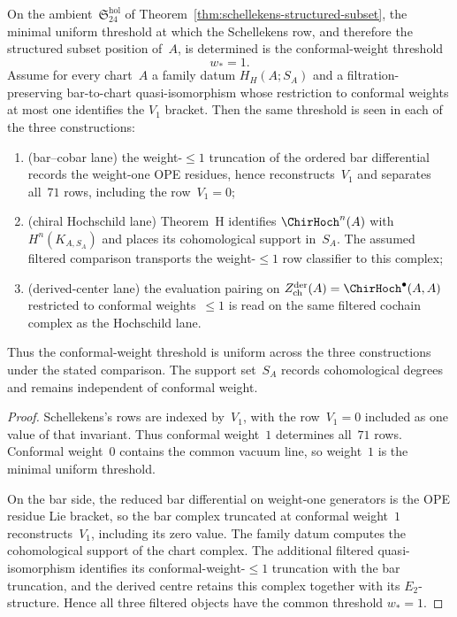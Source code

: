 \begin{proposition}
\label{prop:schellekens-weight-one-threshold}
\label{prop:schellekens-weight-two-threshold}
\ClaimStatusConditional
On the ambient~$\mathfrak{S}_{24}^{\mathrm{hol}}$ of
Theorem~\ref{thm:schellekens-structured-subset}, the minimal uniform
threshold at which the Schellekens row, and therefore the structured
subset position of~$A$, is determined is the conformal-weight threshold
\[
w_\ast = 1.
\]
Assume for every chart~$A$ a family datum $H_H(A;S_A)$ and a
filtration-preserving bar-to-chart quasi-isomorphism whose restriction
to conformal weights at most one identifies the $V_1$ bracket. Then
the same threshold is seen in each
of the three constructions:
\begin{enumerate}[label=\textup{(\roman*)},leftmargin=*]
\item \textup{(}bar--cobar lane\textup{)}
 the weight-$\le1$ truncation of the ordered bar differential records
 the weight-one OPE residues, hence reconstructs~$V_1$ and separates
 all~$71$ rows, including the row~$V_1=0$;
\item \textup{(}chiral Hochschild lane\textup{)}
 Theorem~H identifies
 $\ChirHoch^n(A)$ with $H^n(K_{A,S_A})$ and places its
 cohomological support in~$S_A$.  The assumed filtered comparison
 transports the weight-$\le1$ row classifier to this complex;
\item \textup{(}derived-center lane\textup{)}
 the evaluation pairing on
 $Z^{\mathrm{der}}_{\mathrm{ch}}(A)=\ChirHoch^\bullet(A,A)$ restricted
 to conformal weights~$\le1$ is read on the same filtered cochain
 complex as the Hochschild lane.
\end{enumerate}
Thus the conformal-weight threshold is uniform across the three
constructions under the stated comparison.  The support set~$S_A$
records cohomological degrees and remains independent of conformal
weight.
\end{proposition}

\begin{proof}
Schellekens's rows are indexed by~$V_1$, with the row~$V_1=0$ included
as one value of that invariant. Thus conformal weight~$1$ determines
all~$71$ rows. Conformal weight~$0$ contains the common vacuum line,
so weight~$1$ is the minimal uniform threshold.

On the bar side, the reduced bar differential on weight-one generators
is the OPE residue Lie bracket, so the bar complex truncated at
conformal weight~$1$ reconstructs~$V_1$, including its zero value. The
family datum computes the cohomological support
of the chart complex.  The additional filtered quasi-isomorphism
identifies its conformal-weight-$\le1$ truncation with the bar
truncation, and the derived centre retains this complex together with
its $E_2$-structure.  Hence all three filtered objects have the common
threshold $w_\ast=1$.
\end{proof}

